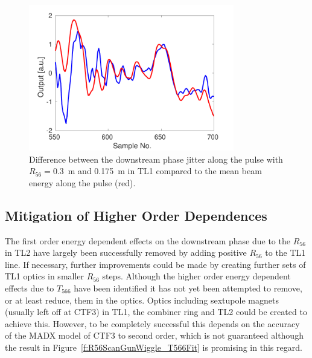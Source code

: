 \begin{figure}
  \centering
  \includegraphics[width=0.8\textwidth]{Figures/propagation/stdPhaseVsMeanEnergyAlong}
  \caption{Difference between the downstream phase jitter along the pulse with \(R_{56} = 0.3\)~m and 0.175~m in TL1 compared to the mean beam energy along the pulse (red).}
  \label{f:stdPhaseVsMeanEnergyAlong}
\end{figure}

\subsection{Mitigation of Higher Order Dependences}
\label{ss:t566Mitigation}

The first order energy dependent effects on the downstream phase due to the \(R_{56}\) in TL2 have largely been successfully removed by adding positive \(R_{56}\) to the TL1 line. If necessary, further improvements could be made by creating further sets of TL1 optics in smaller \(R_{56}\) steps. 
Although the higher order energy dependent effects due to \(T_{566}\) have been identified it has not yet been attempted to remove, or at least reduce, them in the optics. Optics including sextupole magnets (usually left off at CTF3) in TL1, the combiner ring and TL2 could be created to achieve this. However, to be completely successful this depends on the accuracy of the MADX model of CTF3 to second order, which is not guaranteed although the result in Figure~\ref{f:R56ScanGunWiggle_T566Fit} is promising in this regard.

